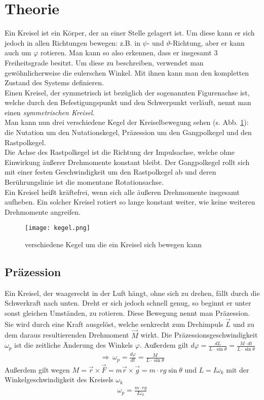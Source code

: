 \documentclass[12pt,a4paper,titlepage,headinclude,bibtotoc]{scrartcl}
\begin{document}
\section{Theorie}
\label{sec:theorie}
Ein Kreisel ist ein Körper, der an einer Stelle gelagert ist.
Um diese kann er sich jedoch in allen Richtungen bewegen: z.B. in $\psi$- und $\vartheta$-Richtung, aber er kann auch um $\varphi$ rotieren.
Man kann so also erkennen, dass er insgesamt 3 Freiheitsgrade besitzt.
Um diese zu beschreiben, verwendet man gewöhnlicherweise die eulerschen Winkel.
Mit ihnen kann man den kompletten Zustand des Systems definieren.\\
Einen Kreisel, der symmetrisch ist bezüglich der sogenannten Figurenachse ist, welche durch den Befestigungspunkt und den Schwerpunkt verläuft, nennt man einen \emph{symmetrischen Kreisel}.\\
Man kann nun drei verschiedene Kegel der Kreiselbewegung sehen (s. Abb. \ref{img:kegel}): die Nutation um den Nutationskegel, Präzession um den Gangpolkegel und den Rastpolkegel.\\
Die Achse des Rastpolkegel ist die Richtung der Impulsachse, welche ohne Einwirkung äußerer Drehmomente konstant bleibt.
Der Gangpolkegel rollt sich mit einer festen Geschwindigkeit um den Rastpolkegel ab und deren Berührungslinie ist die momentane Rotationsachse.\\
Ein Kreisel heißt kräftefrei, wenn sich alle äußeren Drehmomente insgesamt aufheben.
Ein solcher Kreisel rotiert so lange konstant weiter, wie keine weiteren Drehmomente angreifen.


\begin{figure}[h]
\centering
\texttt{[image: kegel.png]}
\caption{verschiedene Kegel um die ein Kreisel sich bewegen kann\protect\footnotemark\label{img:kegel}}
\end{figure}
\subsection{Präzession}
Ein Kreisel, der waagerecht in der Luft hängt, ohne sich zu drehen, fällt durch die Schwerkraft nach unten.
Dreht er sich jedoch schnell genug, so beginnt er unter sonst gleichen Umständen, zu rotieren. Diese Bewegung nennt man Präzession.
Sie wird durch eine Kraft ausgelöst, welche senkrecht zum Drehimpuls $\vec L$ und zu dem daraus resultierenden Drehmoment $\vec M$ wirkt.
Die Präzessionsgeschwindigkeit $\omega_p$ ist die zeitliche Änderung des Winkels $\varphi$.
Außerdem gilt $d\varphi=\frac{dL}{L \cdot\sin\theta}=\frac{M\cdot dt}{L \cdot\sin\theta}$
\begin{align*}
\Rightarrow\:\omega_p=\frac{d\varphi}{dt}=\frac{M}{L \cdot\sin\theta}
\end{align*}
Außerdem gilt wegen $M=\vec{r}\times\vec{F}=m\vec{r}\times\vec{g}=m\cdot rg\sin\theta$ und $L=I\omega_k$ mit der Winkelgeschwindigkeit des Kreisels $\omega_k$
\begin{align}
\omega_p=\frac{m\cdot rg}{I\omega_k}
\end{align}
\end{document}

